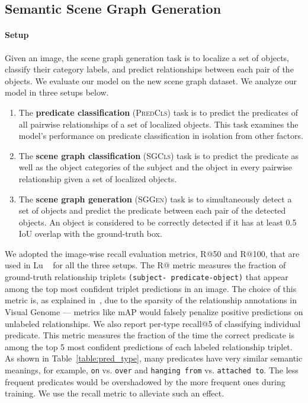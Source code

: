 \documentclass[10pt,twocolumn,letterpaper]{article}
\begin{document}
\vspace{5pt}
\subsection{Semantic Scene Graph Generation}
\label{sec:vg_eval}
\paragraph{Setup} Given an image, the scene graph generation task is to localize
a set of objects, classify their category labels, and predict relationships between each pair
of the objects. We evaluate our model on the new scene graph dataset.
We analyze our model in three setups below.

\begin{enumerate}
\item The \textbf{predicate classification} (\textsc{Pred}\textsc{Cls}) task is to predict the predicates of all pairwise relationships of a set of localized objects.  This task examines the model's performance on predicate classification in isolation from other factors.

\item The \textbf{scene graph classification} (\textsc{SG}\textsc{Cls}) task is to predict the predicate as well as the object categories of the subject and the object in every pairwise relationship given a set of localized objects.

\item The \textbf{scene graph generation} (\textsc{SG}\textsc{Gen}) task is to simultaneously detect a set of objects and predict the predicate between each pair of the detected objects. An object is considered to be correctly detected if it has at least 0.5 IoU overlap with the ground-truth box.
\end{enumerate}


We adopted the image-wise recall evaluation metrics, R@50 and R@100, that are used in Lu \etal~\cite{lu2016visual} for all the three setups. The R@ metric measures the fraction of ground-truth relationship triplets \texttt{(subject- predicate-object)} that appear among the top  most confident triplet predictions in an image. The choice of this metric is, as explained in~\cite{lu2016visual}, due to the sparsity of the relationship annotations in Visual Genome --- metrics like mAP would falsely penalize positive predictions on unlabeled relationships. 
We also report per-type recall@5 of classifying individual predicate. This metric measures the fraction of the time the correct predicate is among the top 5 most confident predictions of each labeled relationship triplet. 
As shown in Table~\ref{table:pred_type}, many predicates have very similar semantic meanings, for example, \texttt{on} vs. \texttt{over} and \texttt{hanging from} vs. \texttt{attached to}. The less frequent predicates would be overshadowed by the more frequent ones during training. We use the recall metric to alleviate such an effect. 
\end{document}
